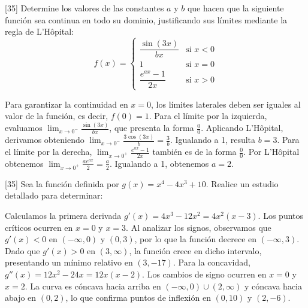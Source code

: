 \documentclass[11pt,paper=a4,answers, addpoints]{exam}
\begin{document}
\begin{questions}
[35]
Determine los valores de las constantes $a$ y $b$ que hacen que la siguiente función sea continua en todo su dominio, justificando sus límites mediante la regla de L'Hôpital:
\[
f(x) = \begin{cases} 
\dfrac{\sin(3x)}{bx} & \text{si } x < 0 \\ 
1 & \text{si } x = 0 \\ 
\dfrac{e^{ax} - 1}{2x} & \text{si } x > 0 
\end{cases}
\]

\begin{solution}
Para garantizar la continuidad en $x=0$, los límites laterales deben ser iguales al valor de la función, es decir, $f(0)=1$. Para el límite por la izquierda, evaluamos $\lim_{x \to 0^-} \frac{\sin(3x)}{bx}$, que presenta la forma $\frac{0}{0}$. Aplicando L'Hôpital, derivamos obteniendo $\lim_{x \to 0^-} \frac{3\cos(3x)}{b} = \frac{3}{b}$. Igualando a 1, resulta $b=3$. Para el límite por la derecha, $\lim_{x \to 0^+} \frac{e^{ax}-1}{2x}$ también es de la forma $\frac{0}{0}$. Por L'Hôpital obtenemos $\lim_{x \to 0^+} \frac{ae^{ax}}{2} = \frac{a}{2}$. Igualando a 1, obtenemos $a=2$.
\end{solution}

[35]
Sea la función definida por $g(x) = x^4 - 4x^3 + 10$. Realice un estudio detallado para determinar:
\vspace{0.5cm}

\begin{solution}
Calculamos la primera derivada $g'(x) = 4x^3 - 12x^2 = 4x^2(x-3)$. Los puntos críticos ocurren en $x=0$ y $x=3$. Al analizar los signos, observamos que $g'(x) < 0$ en $(-\infty, 0)$ y $(0, 3)$, por lo que la función decrece en $(-\infty, 3)$. Dado que $g'(x) > 0$ en $(3, \infty)$, la función crece en dicho intervalo, presentando un mínimo relativo en $(3, -17)$. Para la concavidad, $g''(x) = 12x^2 - 24x = 12x(x-2)$. Los cambios de signo ocurren en $x=0$ y $x=2$. La curva es cóncava hacia arriba en $(-\infty, 0) \cup (2, \infty)$ y cóncava hacia abajo en $(0, 2)$, lo que confirma puntos de inflexión en $(0, 10)$ y $(2, -6)$.
\end{solution}

\end{questions}
\end{document}
